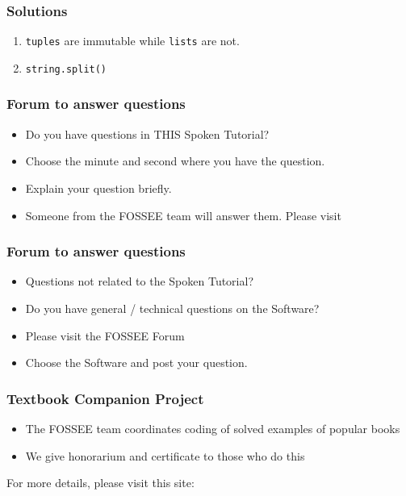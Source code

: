 \documentclass[17pt]{beamer}
\begin{document}
\begin{frame}
\frametitle{Solutions}
\label{sec-15}
\begin{enumerate}
\item \texttt{tuples} are immutable while \texttt{lists} are not.
\vspace{12pt}
\item \texttt{string.split()}
\end{enumerate}
\end{frame}

\begin{frame}
\frametitle{Forum to answer questions}
\begin{itemize}
\item Do you have questions in THIS Spoken Tutorial?
\item Choose the minute and second where you have the question.
\item Explain your question briefly.
\item Someone from the FOSSEE team will answer them. Please visit 
\end{itemize}
\begin{center}
{\color{blue}{http://forums.spoken-tutorial.org/}}
 \end{center} 
\end{frame}
\begin{frame}
\frametitle{Forum to answer questions}
\begin{itemize}
\item Questions not related to the Spoken Tutorial?
\item Do you have general / technical questions on the Software?
\item Please visit the FOSSEE Forum
\begin{center}
{\color{blue}{http://forums.fossee.in/}}
 \end{center}
\item Choose the Software and post your question.
\end{itemize}
\end{frame}
\begin{frame}
\frametitle{Textbook Companion Project}
\begin{itemize}
\item The FOSSEE team coordinates coding of solved examples of popular
  books 
\item We give honorarium and certificate to those who do this
\end{itemize}
For more details, please visit this site:
\begin{center}
{\color{blue}{http://tbc-python.fossee.in/}}
\end{center}
\end{frame}
\end{document}
